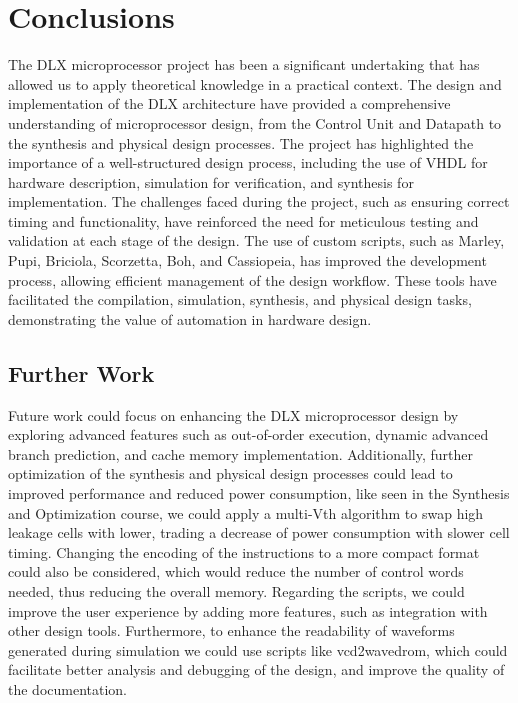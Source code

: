 \chapter{Conclusions}

The DLX microprocessor project has been a significant undertaking that has allowed us to apply theoretical knowledge in a practical context. The design and implementation of the DLX architecture have provided a comprehensive understanding of microprocessor design, from the Control Unit and Datapath to the synthesis and physical design processes.
The project has highlighted the importance of a well-structured design process, including the use of VHDL for hardware description, simulation for verification, and synthesis for implementation. The challenges faced during the project, such as ensuring correct timing and functionality, have reinforced the need for meticulous testing and validation at each stage of the design.
The use of custom scripts, such as Marley, Pupi, Briciola, Scorzetta, Boh, and Cassiopeia, has improved the development process, allowing efficient management of the design workflow. These tools have facilitated the compilation, simulation, synthesis, and physical design tasks, demonstrating the value of automation in hardware design.

\section{Further Work}
Future work could focus on enhancing the DLX microprocessor design by exploring advanced features such as out-of-order execution, dynamic advanced branch prediction, and cache memory implementation. Additionally, further optimization of the synthesis and physical design processes could lead to improved performance and reduced power consumption, like seen in the Synthesis and Optimization course, we could apply 
a multi-Vth algorithm to swap high leakage cells with lower, trading a decrease of power consumption with slower cell timing.
Changing the encoding of the instructions to a more compact format could also be considered, which would reduce the number of control words needed, thus reducing the overall memory.
Regarding the scripts, we could improve the user experience by adding more features, such as integration with other design tools. Furthermore, to enhance the readability of waveforms generated during simulation we could use scripts like vcd2wavedrom, which could facilitate better analysis and debugging of the design, and improve the quality of the documentation.